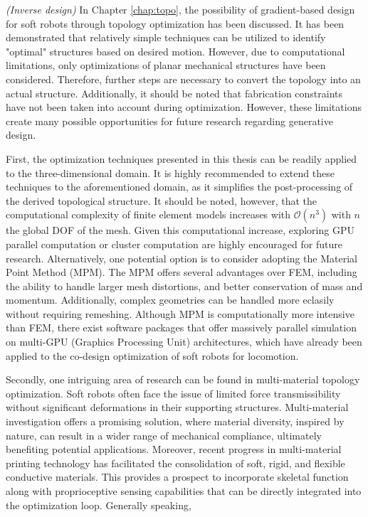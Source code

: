 \textit{(Inverse design)} In Chapter \ref{chap:topo}, the possibility of gradient-based design for soft robots through topology optimization has been discussed. It has been demonstrated that relatively simple techniques can be utilized to identify "optimal" structures based on desired motion. However, due to computational limitations, only optimizations of planar mechanical structures have been considered. Therefore, further steps are necessary to convert the topology into an actual structure. Additionally, it should be noted that fabrication constraints have not been taken into account during optimization. However, these limitations create many possible opportunities for future research regarding generative design. 
\par First, the optimization techniques presented in this thesis can be readily applied to the three-dimensional domain. It is highly recommended to extend these techniques to the aforementioned domain, as it simplifies the post-processing of the derived topological structure. It should be noted, however, that the computational complexity of finite element models increases with $\mathcal{O}(n^3)$ with $n$ the global DOF of the mesh. Given this computational increase, exploring GPU parallel computation or cluster computation are highly encouraged for future research. Alternatively, one potential option is to consider adopting the Material Point Method (MPM). The MPM offers several advantages over FEM, including the ability to handle larger mesh distortions, and better conservation of mass and momentum. Additionally, complex geometries can be handled more eclasily without requiring remeshing. Although MPM is computationally more intensive than FEM, there exist software packages that offer massively parallel simulation on multi-GPU (Graphics Processing Unit) architectures, which have already been applied to the co-design optimization of soft robots for locomotion. 
\par Secondly, one intriguing area of research can be found in multi-material topology optimization. Soft robots often face the issue of limited force transmissibility without significant deformations in their supporting structures. Multi-material investigation offers a promising solution, where material diversity, inspired by nature, can result in a wider range of mechanical compliance, ultimately benefiting potential applications. Moreover, recent progress in multi-material printing technology has facilitated the consolidation of soft, rigid, and flexible conductive materials. This provides a prospect to incorporate skeletal function along with proprioceptive sensing capabilities that can be directly integrated into the optimization loop. Generally speaking, 

